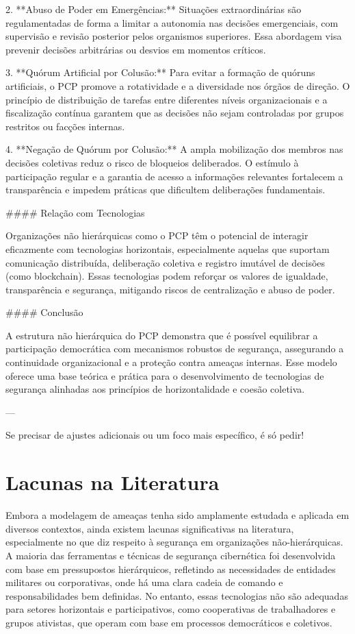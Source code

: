 2. **Abuso de Poder em Emergências:**  
   Situações extraordinárias são regulamentadas de forma a limitar a autonomia nas decisões emergenciais, com supervisão e revisão posterior pelos organismos superiores. Essa abordagem visa prevenir decisões arbitrárias ou desvios em momentos críticos.

3. **Quórum Artificial por Colusão:**  
   Para evitar a formação de quóruns artificiais, o PCP promove a rotatividade e a diversidade nos órgãos de direção. O princípio de distribuição de tarefas entre diferentes níveis organizacionais e a fiscalização contínua garantem que as decisões não sejam controladas por grupos restritos ou facções internas.

4. **Negação de Quórum por Colusão:**  
   A ampla mobilização dos membros nas decisões coletivas reduz o risco de bloqueios deliberados. O estímulo à participação regular e a garantia de acesso a informações relevantes fortalecem a transparência e impedem práticas que dificultem deliberações fundamentais.

#### Relação com Tecnologias

Organizações não hierárquicas como o PCP têm o potencial de interagir eficazmente com tecnologias horizontais, especialmente aquelas que suportam comunicação distribuída, deliberação coletiva e registro imutável de decisões (como blockchain). Essas tecnologias podem reforçar os valores de igualdade, transparência e segurança, mitigando riscos de centralização e abuso de poder.

#### Conclusão

A estrutura não hierárquica do PCP demonstra que é possível equilibrar a participação democrática com mecanismos robustos de segurança, assegurando a continuidade organizacional e a proteção contra ameaças internas. Esse modelo oferece uma base teórica e prática para o desenvolvimento de tecnologias de segurança alinhadas aos princípios de horizontalidade e coesão coletiva.

--- 

Se precisar de ajustes adicionais ou um foco mais específico, é só pedir!

\section{Lacunas na Literatura}
\label{sec:introduction}

Embora a modelagem de ameaças tenha sido amplamente estudada e aplicada em
diversos contextos, ainda existem lacunas significativas na literatura, especialmente
no que diz respeito à segurança em organizações não-hierárquicas. A maioria das
ferramentas e técnicas de segurança cibernética foi desenvolvida com base em pressupostos
hierárquicos, refletindo as necessidades de entidades militares ou corporativas, onde há uma
clara cadeia de comando e responsabilidades bem definidas. No entanto, essas
tecnologias não são adequadas para setores horizontais e participativos, como cooperativas
de trabalhadores e grupos ativistas, que operam com base em processos
democráticos e coletivos. 

